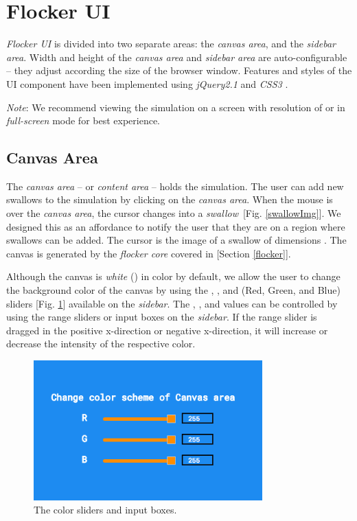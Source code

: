 \documentclass[../main]{subfiles}
\begin{document}
\section{Flocker UI}
\label{flockerUI}

{\em Flocker UI} is divided into two separate areas: the {\em canvas area}, and the {\em sidebar area}. Width and height of the {\em canvas area} and {\em sidebar area} are auto-configurable -- they adjust according the size of the browser window. Features and styles of the UI component have been implemented using {\em jQuery2.1} \cite{jquery} and {\em CSS3} \cite{css3}.

{\em Note}: We recommend viewing the simulation on a screen with resolution of  or  in {\em full-screen} mode for best experience.

\subsection{Canvas Area}
\label{canvasArea}

The {\em canvas area} -- or {\em content area} -- holds the simulation. The user can add new swallows to the simulation by clicking on the {\em canvas area}. When the mouse is over the {\em canvas area}, the cursor changes into a {\em swallow}~[Fig. \ref{swallowImg}]. We designed this as an affordance to notify the user that they are on a region where swallows can be added. The cursor is the image of a swallow of dimensions . The canvas is generated by the {\em flocker core} covered in [Section \ref{flocker}].

Although the canvas is {\em white} () in color by default, we allow the user to change the background color of the canvas by using the , , and  (Red, Green, and Blue) sliders [Fig. \ref{colorSliders}] available on the {\em sidebar}. The , , and  values can be controlled by using the range sliders or input boxes on the {\em sidebar}. If the range slider is dragged in the positive x-direction or negative x-direction, it will increase or decrease the intensity of the respective color.

\begin{figure}
	\centering
	\includegraphics[scale=0.35, width=250pt, frame]{resources/color_sliders.png}
	\caption{The color sliders and input boxes.}
	\label{colorSliders}
\end{figure}
\end{document}
